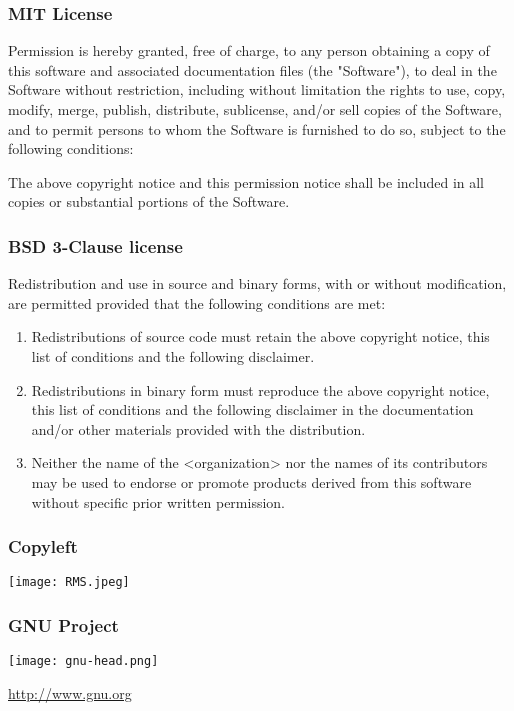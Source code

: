 \begin{frame}[fragile]
\frametitle{MIT License}

Permission is hereby granted, free of charge, to any person
obtaining a copy of this software and associated documentation
files (the "Software"), to deal in the Software without
restriction, \alert{including without limitation the rights to use,
copy, modify, merge, publish, distribute, sublicense, and/or sell
copies of the Software}, and to permit persons to whom the
Software is furnished to do so, subject to the following
conditions:

The above copyright notice and this permission notice shall be
included in all copies or substantial portions of the Software.
\end{frame}

\begin{frame}[fragile]
\frametitle{BSD 3-Clause license}

Redistribution and use in source and binary forms, with or without
modification, are permitted provided that the following conditions are met:
\begin{enumerate}
\item Redistributions of source code must retain the above copyright notice, this list of conditions and the following disclaimer.
\item Redistributions in binary form must reproduce the above copyright notice, this list of conditions and the following disclaimer in the documentation and/or other materials provided with the distribution.
\item Neither the name of the <organization> nor the names of its contributors may be used to endorse or promote products derived from this software without specific prior written permission.
\end{enumerate}

\end{frame}

\begin{frame}[fragile]
\frametitle{Copyleft}

\centering
\texttt{[image: RMS.jpeg]}

\end{frame}

\begin{frame}[fragile]
\frametitle{GNU Project}

\centering
\texttt{[image: gnu-head.png]}

\centering
\href{http://www.gnu.org/}{http://www.gnu.org}

%
\end{frame}


